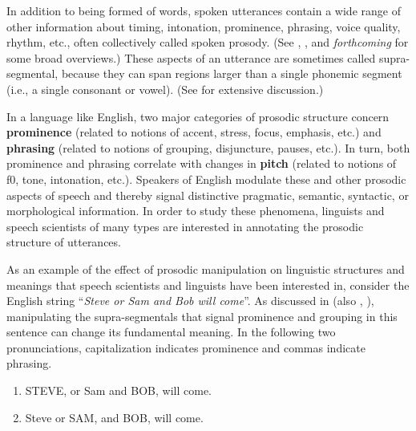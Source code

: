 \documentclass[11pt, twoside]{memoir}
\def\langtext#1{\textit{#1}}
\begin{document}
In addition to being formed of words, spoken utterances contain a wide range of other information about timing, intonation, prominence, phrasing, voice quality, rhythm, etc., often collectively called spoken prosody. (See \citealt{ladd08}, \citealt{beckmanvenditti11}, and \citeauthor{barnesshattuckhufnagel20} \textit{forthcoming} for some broad overviews.) These aspects of an utterance are sometimes called supra-segmental, because they can span regions larger than a single phonemic segment (i.e., a single consonant or vowel). (See \citealt{lehiste70} for extensive discussion.)

In a language like English, two major categories of prosodic structure concern \textbf{prominence} (related to notions of accent, stress, focus, emphasis, etc.) and \textbf{phrasing} (related to notions of grouping, disjuncture, pauses, etc.). In turn, both prominence and phrasing correlate with changes in \textbf{pitch} (related to notions of f0, tone, intonation, etc.). Speakers of English modulate these and other prosodic aspects of speech and thereby signal distinctive pragmatic, semantic, syntactic, or morphological information. In order to study these phenomena, linguists and speech scientists of many types are interested in annotating the prosodic structure of utterances.

As an example of the effect of prosodic manipulation on linguistic structures and meanings that speech scientists and linguists have been interested in, consider the English string “\langtext{Steve or Sam and Bob will come}”. As discussed in \citealt{lehiste73} (also \citealt{price-91}, \citealt{veilleux-06}), manipulating the supra-segmentals that signal prominence and grouping in this sentence can change its fundamental meaning. In the following two pronunciations, capitalization indicates prominence and commas indicate phrasing.

\begin{enumerate} \def\labelenumi{\arabic{enumi}.}
\item STEVE, or Sam and BOB, will come.
\item Steve or SAM, and BOB, will come. \end{enumerate}
\end{document}
